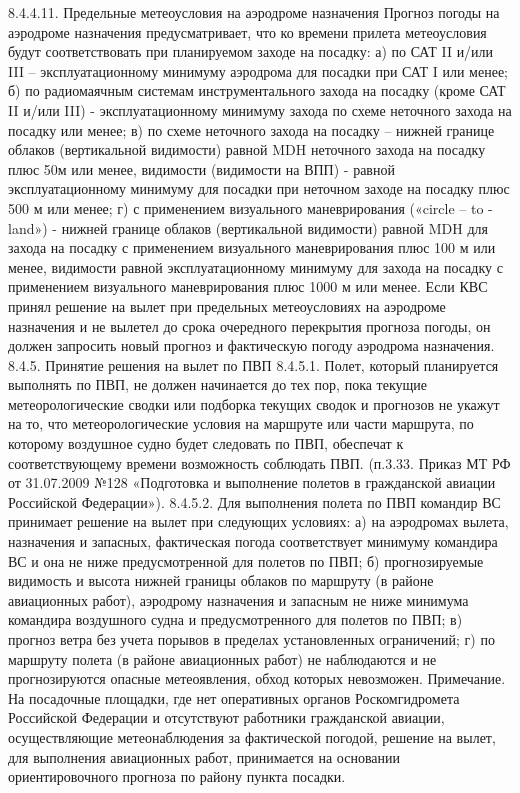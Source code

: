 8.4.4.11. Предельные метеоусловия на аэродроме назначения 
Прогноз погоды на аэродроме назначения предусматривает, что ко времени прилета метеоусловия будут соответствовать при планируемом заходе на посадку: 
а)	по САТ II и/или III – эксплуатационному минимуму аэродрома для посадки при САТ I или менее; 
б)	по радиомаячным системам инструментального захода на посадку (кроме САТ II и/или III) - эксплуатационному минимуму захода по схеме неточного захода на посадку или менее; 
в)	по схеме неточного захода на посадку – нижней границе облаков (вертикальной видимости) равной MDH неточного захода на посадку плюс 50м или менее, видимости (видимости на ВПП) - равной эксплуатационному минимуму для посадки при неточном заходе на посадку плюс 500 м или менее; 
г)	с применением визуального маневрирования («circle – to - land») - нижней границе облаков (вертикальной видимости) равной MDH для захода на посадку с применением визуального маневрирования плюс 100 м или менее, видимости равной эксплуатационному минимуму для захода на посадку с применением визуального маневрирования плюс 1000 м или менее. 
Если КВС принял решение на вылет при предельных метеоусловиях на аэродроме назначения и не вылетел до срока очередного перекрытия прогноза погоды, он должен запросить новый прогноз и фактическую погоду аэродрома назначения. 
8.4.5. Принятие решения на вылет по ПВП
8.4.5.1. Полет, который планируется выполнять по ПВП, не должен начинается до тех пор, пока текущие метеорологические сводки или подборка текущих сводок и прогнозов не укажут на то, что метеорологические условия на маршруте или части маршрута, по которому воздушное судно будет следовать по ПВП, обеспечат к соответствующему времени возможность соблюдать ПВП. (п.3.33. Приказ МТ РФ от 31.07.2009 №128 «Подготовка и выполнение полетов в гражданской авиации Российской Федерации»).
8.4.5.2. Для выполнения полета по ПВП командир ВС принимает решение на вылет при следующих условиях:
а)	на аэродромах вылета, назначения и запасных, фактическая погода соответствует минимуму командира ВС и она не ниже предусмотренной для полетов по ПВП;
б)	прогнозируемые видимость и высота нижней границы облаков по маршруту (в районе авиационных работ), аэродрому назначения и запасным не ниже минимума командира воздушного судна и предусмотренного для полетов по ПВП; 
в)	прогноз ветра без учета порывов в пределах установленных ограничений;
г)	по маршруту полета (в районе авиационных работ) не наблюдаются и не прогнозируются опасные метеоявления, обход которых невозможен.
Примечание. На посадочные площадки, где нет оперативных органов Роскомгидромета Российской Федерации и отсутствуют работники гражданской авиации, осуществляющие метеонаблюдения за фактической погодой, решение на вылет, для выполнения авиационных работ, принимается на основании ориентировочного прогноза по району пункта посадки.
